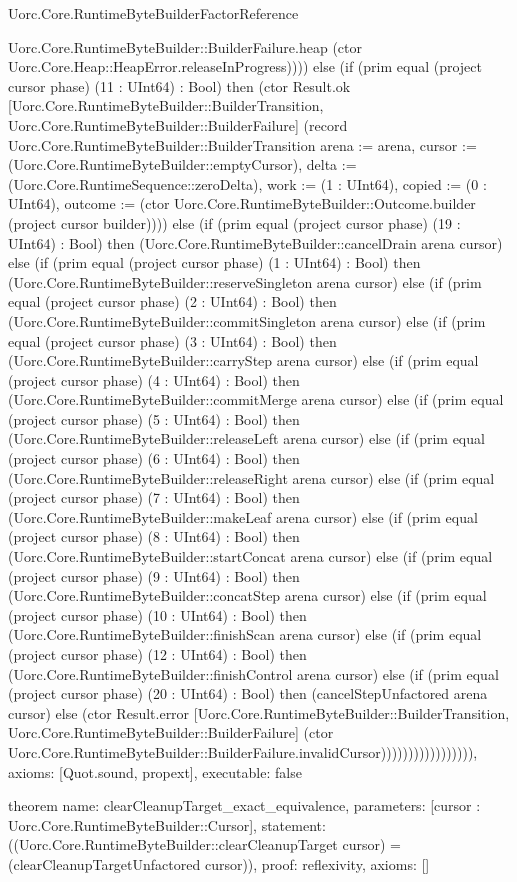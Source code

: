 \begin{lexlean}{Uorc.Core.RuntimeByteBuilderFactorReference}
\begin{semanticmodule}
{Uorc.Core.RuntimeByteBuilder::BuilderFailure.heap (ctor Uorc.Core.Heap::HeapError.releaseInProgress)))) else (if (prim equal (project cursor phase) (11 : UInt64) : Bool) then (ctor Result.ok [Uorc.Core.RuntimeByteBuilder::BuilderTransition, Uorc.Core.RuntimeByteBuilder::BuilderFailure] (record Uorc.Core.RuntimeByteBuilder::BuilderTransition {arena := arena, cursor := (Uorc.Core.RuntimeByteBuilder::emptyCursor), delta := (Uorc.Core.RuntimeSequence::zeroDelta), work := (1 : UInt64), copied := (0 : UInt64), outcome := (ctor Uorc.Core.RuntimeByteBuilder::Outcome.builder (project cursor builder))})) else (if (prim equal (project cursor phase) (19 : UInt64) : Bool) then (Uorc.Core.RuntimeByteBuilder::cancelDrain arena cursor) else (if (prim equal (project cursor phase) (1 : UInt64) : Bool) then (Uorc.Core.RuntimeByteBuilder::reserveSingleton arena cursor) else (if (prim equal (project cursor phase) (2 : UInt64) : Bool) then (Uorc.Core.RuntimeByteBuilder::commitSingleton arena cursor) else (if (prim equal (project cursor phase) (3 : UInt64) : Bool) then (Uorc.Core.RuntimeByteBuilder::carryStep arena cursor) else (if (prim equal (project cursor phase) (4 : UInt64) : Bool) then (Uorc.Core.RuntimeByteBuilder::commitMerge arena cursor) else (if (prim equal (project cursor phase) (5 : UInt64) : Bool) then (Uorc.Core.RuntimeByteBuilder::releaseLeft arena cursor) else (if (prim equal (project cursor phase) (6 : UInt64) : Bool) then (Uorc.Core.RuntimeByteBuilder::releaseRight arena cursor) else (if (prim equal (project cursor phase) (7 : UInt64) : Bool) then (Uorc.Core.RuntimeByteBuilder::makeLeaf arena cursor) else (if (prim equal (project cursor phase) (8 : UInt64) : Bool) then (Uorc.Core.RuntimeByteBuilder::startConcat arena cursor) else (if (prim equal (project cursor phase) (9 : UInt64) : Bool) then (Uorc.Core.RuntimeByteBuilder::concatStep arena cursor) else (if (prim equal (project cursor phase) (10 : UInt64) : Bool) then (Uorc.Core.RuntimeByteBuilder::finishScan arena cursor) else (if (prim equal (project cursor phase) (12 : UInt64) : Bool) then (Uorc.Core.RuntimeByteBuilder::finishControl arena cursor) else (if (prim equal (project cursor phase) (20 : UInt64) : Bool) then (cancelStepUnfactored arena cursor) else (ctor Result.error [Uorc.Core.RuntimeByteBuilder::BuilderTransition, Uorc.Core.RuntimeByteBuilder::BuilderFailure] (ctor Uorc.Core.RuntimeByteBuilder::BuilderFailure.invalidCursor))))))))))))))))),
  axioms: [Quot.sound, propext],
  executable: false
}

theorem{
  name: clearCleanupTarget_exact_equivalence,
  parameters: [cursor : Uorc.Core.RuntimeByteBuilder::Cursor],
  statement: ((Uorc.Core.RuntimeByteBuilder::clearCleanupTarget cursor) = (clearCleanupTargetUnfactored cursor)),
  proof: reflexivity{},
  axioms: []
}


\end{semanticmodule}
\end{lexlean}
